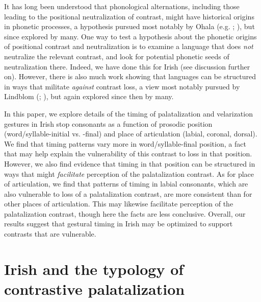 \documentclass[output=paper,colorlinks,citecolor=brown]{langscibook}
\begin{document}
It has long been understood that phonological alternations, including those leading to the positional neutralization of contrast, might have historical origins in phonetic processes, a hypothesis pursued most notably by Ohala (e.g. \cite{Ohala1981_listener_sound_change}; \citeyear{Ohala1993_phonetics_sound_change}), but since explored by many. One way to test a hypothesis about the phonetic origins of positional contrast and neutralization is to examine a language that does \textit{not} neutralize the relevant contrast, and look for potential phonetic seeds of neutralization there. Indeed, we have done this for Irish (see discussion further on). However, there is also much work showing that languages can be structured in ways that militate \emph{against} contrast loss, a view most notably pursued by Lindblom (\citeyear{Lindblom1986_V_system_universals}; \citeyear{Lindblom1990_HH_theory}), but again explored since then by many. 

In this paper, we explore details of the timing of palatalization and velarization gestures in Irish stop consonants as a function of prosodic position (word\slash syllable\hyp initial vs. -final) and place of articulation (labial, coronal, dorsal). We find that timing patterns vary more in word\slash syllable\hyp final position, a fact that may help explain the vulnerability of this contrast to loss in that position. However, we also find evidence that timing in that position can be structured in ways that might \textit{facilitate} perception of the palatalization contrast. As for place of articulation, we find that patterns of timing in labial consonants, which are also vulnerable to loss of a palatalization contrast, are more consistent than for other places of articulation. This may likewise facilitate perception of the palatalization contrast, though here the facts are less conclusive. Overall, our results suggest that gestural timing in Irish may be optimized to support contrasts that are vulnerable. 

\section{Irish and the typology of contrastive palatalization}
\end{document}
